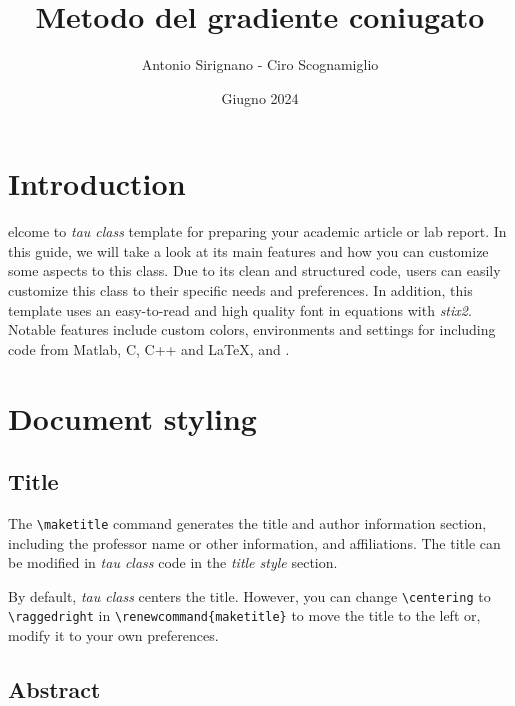 \documentclass[9pt,a4paper,twoside]{tau}
\title{Metodo del gradiente coniugato}
\author{Antonio Sirignano - Ciro Scognamiglio}
\date{Giugno 2024}
\begin{document}
		
	\maketitle
	\thispagestyle{firststyle}
	\tauabstract
	\tableofcontents


\section{Introduction}

    elcome to \textit{tau class} template for preparing your academic article or lab report. In this guide, we will take a look at its main features and how you can customize some aspects to this class. Due to its clean and structured code, users can easily customize this class to their specific needs and preferences. In addition, this template uses an easy-to-read and high quality font in equations with \textit{stix2}. Notable features include custom colors, environments and settings for including code from Matlab, C, C++ and \LaTeX, and .
    
\section{Document styling}

    \subsection{Title}
	
        The \verb*|\maketitle| command generates the title and author information section, including the professor name or other information, and affiliations. The title can be modified in \textit{tau class} code in the \textit{title style} section. 
 
        By default, \textit{tau class} centers the title. However, you can change \verb*|\centering| to \verb*|\raggedright| in \verb*|\renewcommand{maketitle}| to move the title to the left or, modify it to your own preferences.
	
    \subsection{Abstract}
	
\end{document}
